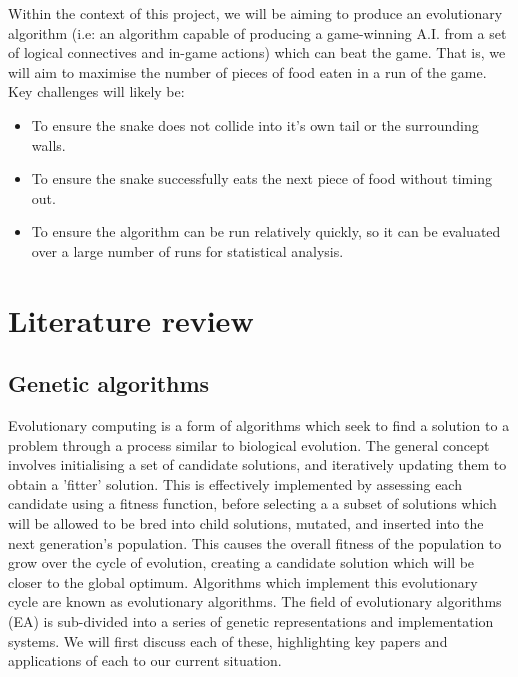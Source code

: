 \documentclass[british,10pt,a4paper]{article}
\begin{document}
Within the context of this project, we will be aiming to produce an evolutionary algorithm (i.e: an algorithm capable of producing a game-winning A.I. from a set of logical connectives and in-game actions) which can beat the game. That is, we will aim to maximise the number of pieces of food eaten in a run of the game. Key challenges will likely be:
\begin{itemize}
	\item To ensure the snake does not collide into it's own tail or the surrounding walls.
	\item To ensure the snake successfully eats the next piece of food without timing out.
	\item To ensure the algorithm can be run relatively quickly, so it can be evaluated over a large number of runs for statistical analysis.
\end{itemize}

\section{Literature review}
\subsection{Genetic algorithms}
Evolutionary computing is a form of algorithms which seek to find a solution to a problem through a process similar to biological evolution. \cite{Ashlock_undated-vx} The general concept involves initialising a set of candidate solutions, and iteratively updating them to obtain a 'fitter' solution. This is effectively implemented by assessing each candidate using a fitness function, before selecting a a subset of solutions which will be allowed to be bred into child solutions, mutated, and inserted into the next generation's population. This causes the overall fitness of the population to grow over the cycle of evolution, creating a candidate solution which will be closer to the global optimum. Algorithms which implement this evolutionary cycle are known as evolutionary algorithms. The field of evolutionary algorithms (EA) is sub-divided into a series of genetic representations and implementation systems. We will first discuss each of these, highlighting key papers and applications of each to our current situation.\newline
\end{document}
